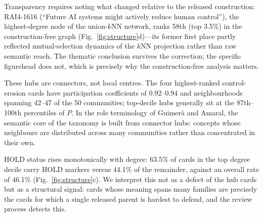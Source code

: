 \documentclass[fleqn,10pt]{wlscirep}
\begin{document}
Transparency requires noting what changed relative to the released
construction: RAI4-1616 (``Future AI systems might actively reduce human
control''), the highest-degree node of the union-$k$NN network, ranks 58th
(top 3.5\%) in the construction-free graph
(Fig.~\ref{fig:structure}d)---its former first place partly reflected
mutual-selection dynamics of the $k$NN projection rather than raw semantic
reach. The thematic conclusion survives the correction; the specific
figurehead does not, which is precisely why the construction-free analysis
matters.

These hubs are connectors, not local centres. The four highest-ranked
control-erosion cards have participation coefficients\cite{guimera2005} of
0.92--0.94 and neighbourhoods spanning 42--47 of the 50 communities;
top-decile hubs generally sit at the 87th--100th percentiles of $P$. In the
role terminology of Guimer\`a and Amaral, the semantic core of the taxonomy
is built from connector hubs: concepts whose neighbours are distributed
across many communities rather than concentrated in their own.

HOLD status rises monotonically with degree: 63.5\% of cards in the top
degree decile carry HOLD markers versus 44.1\% of the remainder, against an
overall rate of 46.1\% (Fig.~\ref{fig:structure}c). We interpret this not
as a defect of the hub cards but as a structural signal: cards whose
meaning spans many families are precisely the cards for which a single
released parent is hardest to defend, and the review process detects this.
\end{document}
